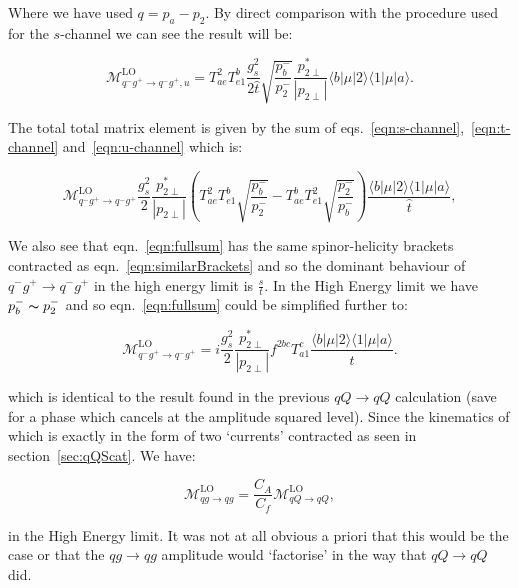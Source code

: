 			Where we have used $q=p_a-p_2$.  By direct comparison with the procedure used for the $s$-channel we can see the result will be:

			\begin{equation}
			\mathcal{M}_{q^-g^+\to q^-g^+, u}^{\text{LO}}=
			T^2_{ae}T^b_{e1}\frac{g_s^2}{2\hat{t}}\sqrt{\frac{p_b^-}{p_2^-}}\frac{p^*_{2\perp}}{|p_{2\perp}|}\langle{b}|\mu|2\rangle\langle{1}|\mu|a\rangle.
			\label{eqn:u-channel}
			\end{equation}

			The total total matrix element is given by the sum of eqs.~\eqref{eqn:s-channel},~\eqref{eqn:t-channel} and~\eqref{eqn:u-channel} which is:

			\begin{equation}
				\mathcal{M}_{q^-g^+\to q^-g^+}^{\text{LO}}
				\frac{g_s^2}{2}\frac{p_{2\perp}^*}{|p_{2\perp}|}\left(T^2_{ae}T^b_{e1}\sqrt{\frac{p_b^-}{p_2^-}}-T^b_{ae}T^2_{e1}
				\sqrt{\frac{p_2^-}{p_b^-}}\right)\frac{\langle{b}|\mu|2\rangle\langle{1}|\mu|a\rangle}{\hat{t}},
				\label{eqn:fullsum}
			\end{equation}

			We also see that eqn.~\eqref{eqn:fullsum} has the same spinor-helicity brackets contracted as eqn.~\eqref{eqn:similarBrackets}
			and so the dominant behaviour of $q^-g^+\to q^-g^+$ in the high energy limit is $\frac{s}{t}$.
			In the High Energy limit we have $p_b^-\thicksim p_2^-$ and so eqn.~\eqref{eqn:fullsum} could be simplified
			further to:

			\begin{equation}
				\mathcal{M}_{q^-g^+\to q^-g^+}^{\text{LO}}=i\frac{g_s^2}{2}\frac{p_{2\perp}^*}{|p_{2\perp}|}f^{2bc}T^c_{a1}
				\frac{\langle{b}|\mu|2\rangle\langle{1}|\mu|a\rangle}{\hat{t}}.
				\label{eqn:fullsum2}
			\end{equation}

			which is identical to the result found in the previous $qQ\rightarrow qQ$ calculation (save for a phase which cancels
			at the amplitude squared level). Since the kinematics of which is exactly in the form of two `currents' contracted as
			seen in section~\ref{sec:qQScat}.  We have:

			\begin{equation}
				\mathcal{M}_{qg\to qg}^{\text{LO}} = \frac{C_A}{C_f} \mathcal{M}_{qQ\to qQ}^{\text{LO}},
			\end{equation}

			in the High Energy limit.  It was not at all obvious a priori that this would be the case or that the $qg\to qg$
			amplitude would `factorise' in the way that $qQ\to qQ$ did.

